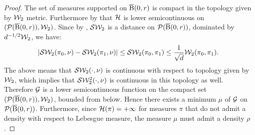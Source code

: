 \begin{proof}
The set of measures supported on $\operatorname{\overline{B}}(0,r)$ is compact in the topology given by ${\cal W}_2$ metric. Furthermore by \cite[Lemma 9.4.3]{ambrosio2008gradient}  that  ${\cal H}$ is lower semicontinuous on $({\cal P}(\operatorname{\overline{B}}(0,r)),{\cal W}_2)$. Since by \cite[Proposition 5.1.2, Proposition 5.1.3]{bonnotte2013unidimensional}, ${\cal S}{\cal W}_2$ is a distance  on ${\cal P}(\operatorname{\overline{B}}(0,r))$, dominated by $d^{-1/2} {\cal W}_2$, we have:
\[
|{\cal S}{\cal W}_2(\pi_0, \nu) - {\cal S}{\cal W}_2(\pi_1, \nu)| \leq {\cal S}{\cal W}_2(\pi_0, \pi_1) \leq \frac{1}{\sqrt{d}}{\cal W}_2(\pi_0, \pi_1).
\]
The above means that ${\cal S}{\cal W}_2(\cdot, \nu)$ is continuous with respect to topology given by ${\cal W}_2$, which implies that ${\cal S}{\cal W}_2^2(\cdot, \nu)$ is continuous in this topology as well. Therefore $\mathcal{G}$ is a lower semicontinuous function on the compact set $({\cal P}(\operatorname{\overline{B}}(0,r)),{\cal W}_2)$, bounded from below. Hence there exists a minimum  $\mu$ of $\mathcal{G}$ on $\mathcal{P}(\operatorname{\overline{B}}(0,r))$. Furthermore, since $\mathcal{H}(\pi) = +\infty$  for measures $\pi$ that do not admit a density with respect to Lebesgue measure, the measure $\mu$ must admit a density $\rho$.


\end{proof}
